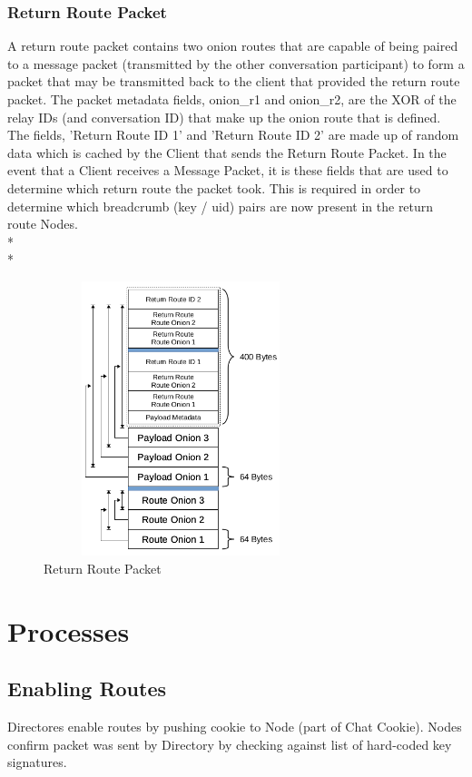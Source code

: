 \documentclass{article}
\begin{document}
\subsubsection{Return Route Packet}
A return route packet contains two onion routes that are capable of being paired to a message packet (transmitted by the other conversation participant) to form a packet that may be transmitted back to the client that provided the
return route packet. The packet metadata fields, onion\_r1 and onion\_r2, are the XOR of the relay IDs (and conversation ID) that make up the onion route that is defined. The fields, 'Return Route ID 1' and 'Return Route ID 2' are made up of random data which is cached by the Client that sends the Return Route Packet. In the event that a Client receives a Message Packet, it is these fields that are used to determine which return route the packet took. This is required in order to determine which breadcrumb (key / uid) pairs are now present in the return route Nodes.\\*\\*
\begin{figure}[h]
	\centering
  	\includegraphics[width=8cm,height=8cm,keepaspectratio]{img/ReturnRoutePacketStructure.png}
	\caption{Return Route Packet}
\end{figure}
\newpage

\section{Processes}
\subsection{Enabling Routes}
Directores enable routes by pushing cookie to Node (part of Chat Cookie). Nodes confirm packet was sent by Directory by checking against list of hard-coded key signatures.
\end{document}
